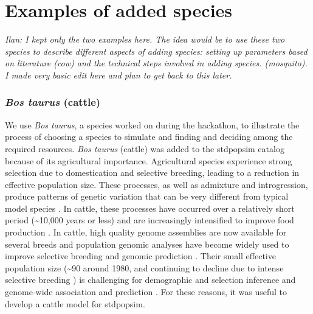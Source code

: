 \documentclass[hidelinks]{article}
\begin{document}
\hypertarget{sec5}{%
	\section*{Examples of added species}\label{sec:std-sim}}

\noindent\emph{Ilan: I kept only the two examples here. The idea would be to
use these two species to describe different aspects of adding species: setting up parameters based on literature (cow) and the technical steps involved in adding species.  (mosquito).
I made very basic edit here and plan to get back to this later.\vspace{5pt}}

\hypertarget{bos-taurus}{%
	\subsubsection*{\texorpdfstring{\emph{Bos
				taurus} (cattle)}{Bos taurus (cattle)}}\label{bos-taurus}}

We use \emph{Bos taurus}, a species worked on during the hackathon, to
illustrate the process of choosing a species to simulate and finding and
deciding among the required resources.
%
%
\emph{Bos taurus} (cattle) was added to the stdpopsim catalog 
because of its agricultural importance. Agricultural species experience
strong selection due to domestication and selective breeding, leading
to a reduction in effective population size. These processes,
as well as admixture and introgression, produce patterns
of genetic variation that can be very different from typical model
species \citep{Larson2013}. In cattle, these processes have occurred over a
relatively short period (\textasciitilde 10,000 years or less) and are
increasingly intensified to improve food production \citep{Gaut2018,
MacLeod2013}. In cattle, high quality genome assemblies are now
available for several breeds \citep[e.g.,][]{Rosen2020, Heaton2021,
Talenti2022} and population genomic analyses have become widely used to
improve selective breeding and genomic prediction \citep{Meuwissen2001,
MacLeod2014, Obsteter2021}. Their small effective population size
(\textasciitilde 90 around 1980, and continuing to decline due to intense
selective breeding \citep{MacLeod2013, VanRaden2020, Makanjouloa2020}) is
challenging for demographic and selection inference \citep{MacLeod2013,
Hartfield2022} and genome-wide association and prediction
\citep{MacLeod2014}. For these reasons, it was useful to develop a
cattle model for stdpopsim.
\end{document}
